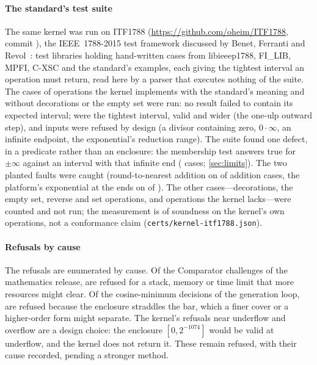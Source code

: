 \documentclass[preprint,11pt,a4paper]{elsarticle}
\theoremstyle{definition}
\begin{document}
\paragraph{The standard's test suite}
The same kernel was run on ITF1788 (\url{https://github.com/oheim/ITF1788}, commit \MtItfCommit), the IEEE~1788-2015 test framework discussed by Benet, Ferranti and Revol~\citep{Benet24}: \MtItfFiles{} test libraries holding \MtItfTests{} hand-written cases from libieeep1788, FI\_LIB, MPFI, C-XSC and the standard's examples, each giving the tightest interval an operation must return, read here by a parser that executes nothing of the suite. The \MtItfRun{} cases of operations the kernel implements with the standard's meaning and without decorations or the empty set were run: no result failed to contain its expected interval; \MtItfTight{} were the tightest interval, \MtItfContained{} valid and wider (the one-ulp outward step), and \MtItfRefused{} inputs were refused by design (a divisor containing zero, $0\cdot\infty$, an infinite endpoint, the exponential's reduction range). The suite found one defect, in a predicate rather than an enclosure: the membership test answers true for $\pm\infty$ against an interval with that infinite end (\MtItfMemberViolationsWord{} cases; \cref{sec:limits}). The two planted faults were caught (round-to-nearest addition on \MtItfRedAdd{} of \MtItfRedAddOf{} addition cases, the platform's exponential at the ends on \MtItfRedExp{} of \MtItfRedExpOf). The other \MtItfNotApplicable{} cases---decorations, the empty set, reverse and set operations, and operations the kernel lacks---were counted and not run; the measurement is of soundness on the kernel's own operations, not a conformance claim (\texttt{certs/kernel-itf1788.json}).

\paragraph{Refusals by cause}\label{sec:eval}
The refusals are enumerated by cause. Of the \MtEvChallenges{} Comparator challenges of the mathematics release, \MtEvResources{} are refused for a stack, memory or time limit that more resources might clear. Of the \MtEvCosineDecisions{} cosine-minimum decisions of the generation loop, \MtEvStraddles{} are refused because the enclosure straddles the bar, which a finer cover or a higher-order form might separate. The kernel's \MtArbInDomainRefused{} refusals near underflow and overflow are a design choice: the enclosure $[0, 2^{-1074}]$ would be valid at underflow, and the kernel does not return it. These remain refused, with their cause recorded, pending a stronger method.
\end{document}
